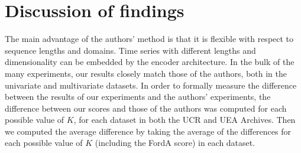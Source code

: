 


\newpage
\section{Discussion of findings}
\label{sect:disc}
The main advantage of the authors' method is that it is flexible with respect to sequence lengths and domains. Time series with different lengths and dimensionality can be embedded by the encoder architecture. In the bulk of the many experiments, our results closely match those of the authors, both in the univariate and multivariate datasets. In order to formally measure the difference between the results of our experiments and the authors' experiments, the difference between our scores and those of the authors was computed for each possible value of $K$, for each dataset in both the UCR and UEA Archives. Then we computed the average difference by taking the average of the differences for each possible value of $K$ (including the FordA score) in each dataset.

